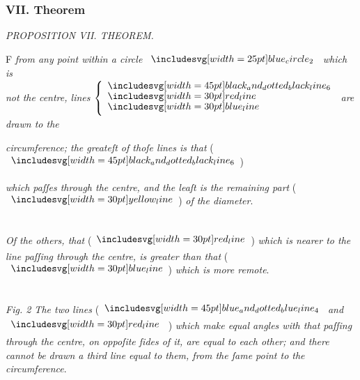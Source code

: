 \documentclass[12pt,preview]{standalone}
\begin{document}
\subsubsection{VII. Theorem}

\begin{minipage}[t]{0.64\textwidth}
    \vspace{0pt}

    \begin{center}
        \textit{PROPOSITION VII. THEOREM.}\label{book3pr7}\\
    \end{center}

    \hfill

    \begin{center}
        \raggedright \lettrine[lines=4, loversize=1, nindent=0pt]{}{}F \textit{from any point within a circle} $\img{blue_circle_2}$ \textit{which is\\ not the centre, lines} $\left\{\begin{aligned} & \bimg{black_and_dotted_black_line_6} \\[-2ex] & \redline \\[-2ex] & \blueline \end{aligned}\right.$ \textit{are drawn to the}
    \end{center}
    \vspace{1ex}
    \textit{circumference; the greateſt of thoſe lines is that} (\hspace{-1ex}$\bimg{black_and_dotted_black_line_6}$\hspace{-1ex}) \raggedright \textit{which paſſes through the centre, and the leaſt is the remaining part} (\hspace{-1ex}$\yellowline$\hspace{-1ex}) \textit{of the diameter}.

    \hfill\\

    \textit{Of the others, that} (\hspace{-1ex}$\redline$\hspace{-1ex}) \textit{which is nearer to the line paſſing through the centre, is greater than that} (\hspace{-1ex}$\blueline$\hspace{-1ex}) \textit{which is more remote}.

    \hfill\\

    \textit{Fig. 2 The two lines} (\hspace{-1ex}$\bimg{blue_and_dotted_blue_line_4}$ \textit{and} $\redline$ \hspace{-1ex}) \textit{which make equal angles with that paſſing through the centre, on oppoſite ſides of it, are equal to each other; and there cannot be drawn a third line equal to them, from the ſame point to the circumference}.


\end{minipage}
\end{document}
